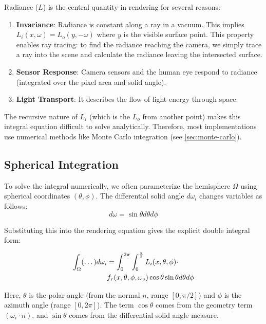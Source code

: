 Radiance ($L$) is the central quantity in rendering for several reasons:
\begin{enumerate}
    \item \textbf{Invariance}: Radiance is constant along a ray in a vacuum.
    This implies $L_i(x, \omega) = L_o(y, -\omega)$ where $y$ is the visible surface point.
    This property enables ray tracing: to find the radiance reaching the camera,
    we simply trace a ray into the scene and calculate the radiance leaving the intersected surface.
    \item \textbf{Sensor Response}: Camera sensors and the human eye respond to radiance
    (integrated over the pixel area and solid angle).
    \item \textbf{Light Transport}: It describes the flow of light energy through space.
\end{enumerate}

The recursive nature of $L_i$ (which is the $L_o$ from another point)
makes this integral equation difficult to solve analytically.
Therefore, most implementations use numerical methods like Monte Carlo integration (see \cref{sec:monte-carlo}).

\subsection{Spherical Integration}

To solve the integral numerically, we often parameterize the hemisphere $\Omega$
using spherical coordinates $(\theta, \phi)$.
The differential solid angle $d\omega_i$ changes variables as follows:
\begin{equation}
    d\omega = \sin\theta d\theta d\phi\label{eq:omega-cov}
\end{equation}

Substituting this into the rendering equation gives the explicit double integral form:

\begin{align}
    \int_{\Omega} (\dots) d\omega_i &= \int_{0}^{2\pi} \int_{0}^{\frac{\pi}{2}} L_i(x, \theta, \phi) \cdot \notag \\
    & f_r(x, \theta, \phi, \omega_o) \cos\theta \sin\theta d\theta d\phi
\end{align}

Here, $\theta$ is the polar angle (from the normal $n$, range $[0, \pi/2]$)
and $\phi$ is the azimuth angle (range $[0, 2\pi]$).
The term $\cos\theta$ comes from the geometry term $(\omega_i \cdot n)$,
and $\sin\theta$ comes from the differential solid angle measure.

